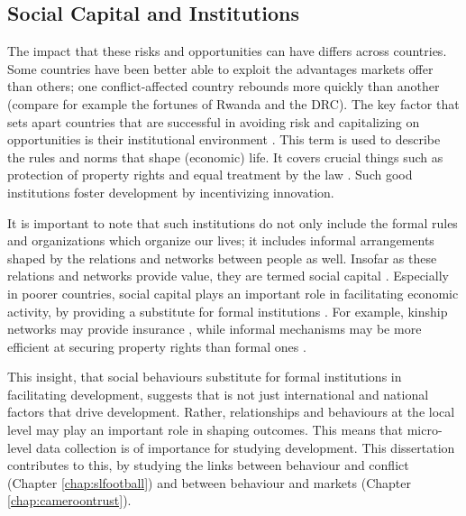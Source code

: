 \subsection{Social Capital and Institutions}
The impact that these risks and opportunities can have differs across countries. Some countries have been better able to exploit the advantages markets offer than others; one conflict-affected country rebounds more quickly than another (compare for example the fortunes of Rwanda and the DRC). The key factor that sets apart countries that are successful in avoiding risk and capitalizing on opportunities is their institutional environment \citep{Rodrik2004,Acemoglu2000}. This term is used to describe the rules and norms that shape (economic) life. It covers crucial things such as protection of property rights and equal treatment by the law \citep{Acemoglu2005}. Such good institutions  foster development by incentivizing innovation. %

It is important to note that such institutions do not only include the formal rules and organizations which organize our lives; it includes informal arrangements shaped by the relations and networks between people as well. Insofar as these relations and networks provide value, they are termed social capital \citep[see for a more detailed discussion of the definition of the term][]{Putnam2001}. Especially in poorer countries, social capital plays an important role in facilitating economic activity, by providing a substitute for formal institutions \citep{Knack1997}. For example, kinship networks may provide insurance \citep{DiFalco2011}, while informal mechanisms may be more efficient at securing property rights than formal ones \citep{Platteau1996}. 

This insight, that social behaviours substitute for formal institutions in facilitating development, suggests that is not just international and national factors that drive development. Rather, relationships and behaviours at the local level may play an important role in shaping outcomes. This means that micro-level data collection is of importance for studying development. This dissertation contributes to this, by studying the links between behaviour and conflict (Chapter \ref{chap:slfootball}) and between behaviour and markets (Chapter \ref{chap:cameroontrust}).

